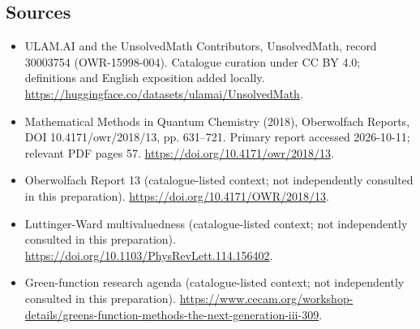 \documentclass[11pt]{article}
\begin{document}
\subsection{Sources}
\begin{itemize}
\item[\hypertarget{source:30003754:1}{S1}] ULAM.AI and the UnsolvedMath Contributors, UnsolvedMath, record 30003754 (OWR-15998-004). Catalogue curation under CC BY 4.0; definitions and English exposition added locally.
\url{https://huggingface.co/datasets/ulamai/UnsolvedMath}.
\item[\hypertarget{source:30003754:2}{S2}] Mathematical Methods in Quantum Chemistry (2018), Oberwolfach Reports, DOI 10.4171/owr/2018/13, pp. 631--721. Primary report accessed 2026-10-11; relevant PDF pages 57.
\url{https://doi.org/10.4171/owr/2018/13}.
\item[\hypertarget{source:30003754:3}{S3}] Oberwolfach Report 13 (catalogue-listed context; not independently consulted in this preparation).
\url{https://doi.org/10.4171/OWR/2018/13}.
\item[\hypertarget{source:30003754:4}{S4}] Luttinger-Ward multivaluedness (catalogue-listed context; not independently consulted in this preparation).
\url{https://doi.org/10.1103/PhysRevLett.114.156402}.
\item[\hypertarget{source:30003754:5}{S5}] Green-function research agenda (catalogue-listed context; not independently consulted in this preparation).
\url{https://www.cecam.org/workshop-details/greens-function-methods-the-next-generation-iii-309}.
\end{itemize}
\label{end:30003754}
\end{document}

